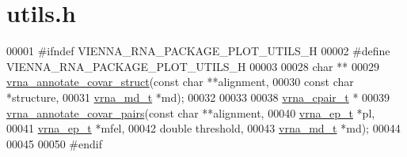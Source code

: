 \hypertarget{plotting_2utils_8h_source}{}\section{utils.\+h}
\label{plotting_2utils_8h_source}

\begin{DoxyCode}
00001 \textcolor{preprocessor}{#ifndef VIENNA\_RNA\_PACKAGE\_PLOT\_UTILS\_H}
00002 \textcolor{preprocessor}{#define VIENNA\_RNA\_PACKAGE\_PLOT\_UTILS\_H}
00003 
00028 \textcolor{keywordtype}{char} **
00029 \hyperlink{group__annotation__utils_gae0305bbf95eddd4a57648a1e4739a7f3}{vrna\_annotate\_covar\_struct}(\textcolor{keyword}{const} \textcolor{keywordtype}{char} **alignment,
00030                            \textcolor{keyword}{const} \textcolor{keywordtype}{char} *structure,
00031                            \hyperlink{group__model__details_structvrna__md__s}{vrna\_md\_t}  *md);
00032 
00033 
00038 \hyperlink{group__data__structures_structvrna__cpair__s}{vrna\_cpair\_t} *
00039 \hyperlink{group__annotation__utils_gadb9ba32197f05d5876d389b2ba92edac}{vrna\_annotate\_covar\_pairs}(\textcolor{keyword}{const} \textcolor{keywordtype}{char}  **alignment,
00040                           \hyperlink{group__struct__utils__plist_structvrna__elem__prob__s}{vrna\_ep\_t}   *pl,
00041                           \hyperlink{group__struct__utils__plist_structvrna__elem__prob__s}{vrna\_ep\_t}   *mfel,
00042                           \textcolor{keywordtype}{double}      threshold,
00043                           \hyperlink{group__model__details_structvrna__md__s}{vrna\_md\_t}   *md);
00044 
00045 
00050 \textcolor{preprocessor}{#endif}
\end{DoxyCode}

